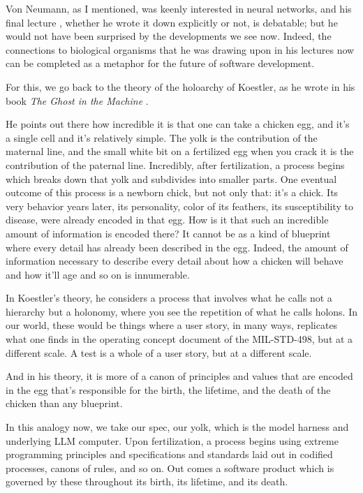 \documentclass[12pt]{extarticle}
\begin{document}
Von Neumann, as I mentioned, was keenly interested in neural networks, and his final lecture \cite{vonneumann1958}, whether he wrote it down explicitly or not, is debatable; but he would not have been surprised by the developments we see now. Indeed, the connections to biological organisms that he was drawing upon in his lectures now can be completed as a metaphor for the future of software development.

For this, we go back to the theory of the holoarchy of Koestler, as he wrote in his book \emph{The Ghost in the Machine} \cite{koestler1967}.

He points out there how incredible it is that one can take a chicken egg, and it's a single cell and it's relatively simple. The yolk is the contribution of the maternal line, and the small white bit on a fertilized egg when you crack it is the contribution of the paternal line. Incredibly, after fertilization, a process begins which breaks down that yolk and subdivides into smaller parts. One eventual outcome of this process is a newborn chick, but not only that: it's a chick. Its very behavior years later, its personality, color of its feathers, its susceptibility to disease, were already encoded in that egg. How is it that such an incredible amount of information is encoded there? It cannot be as a kind of blueprint where every detail has already been described in the egg. Indeed, the amount of information necessary to describe every detail about how a chicken will behave and how it'll age and so on is innumerable.

In Koestler's theory, he considers a process that involves what he calls not a hierarchy but a holonomy, where you see the repetition of what he calls holons. In our world, these would be things where a user story, in many ways, replicates what one finds in the operating concept document of the MIL-STD-498, but at a different scale. A test is a whole of a user story, but at a different scale.

And in his theory, it is more of a canon of principles and values that are encoded in the egg that's responsible for the birth, the lifetime, and the death of the chicken than any blueprint.

In this analogy now, we take our spec, our yolk, which is the model harness and underlying LLM computer. Upon fertilization, a process begins using extreme programming principles and specifications and standards laid out in codified processes, canons of rules, and so on. Out comes a software product which is governed by these throughout its birth, its lifetime, and its death.
\end{document}
